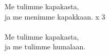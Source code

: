 
            Me tulimme kapakasta, \\
            ja me menimme kapakkaan. x 3 \\
\hspace{10mm} \\
            Me tulimme kapakasta, \\
            ja me tulimme humalaan. \\
